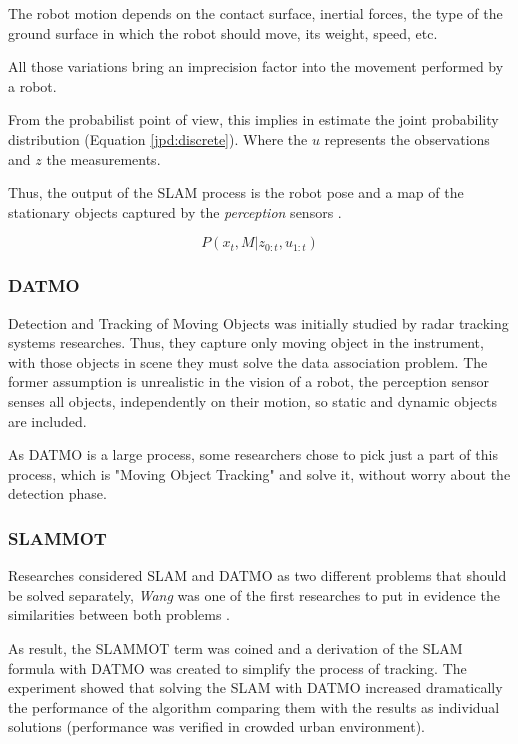 The robot motion depends on the contact surface, inertial forces, the type of the ground surface in which the robot should move, its weight, speed, etc.

All those variations bring an imprecision factor into the movement performed by a robot.

From the probabilist point of view, this implies in estimate the joint probability distribution (Equation \ref{jpd:discrete}). Where the $u$ represents the observations and $z$ the measurements.

Thus, the output of the SLAM process is the robot pose and a map of the stationary objects captured by the \textit{perception} sensors \cite{iyengar1991autonomous}.


\begin{equation}
\label{jpd:discrete}
P(x_t,M | z_{0:t}, u_{1:t})
\end{equation}


\subsubsection{DATMO}

Detection and Tracking of Moving Objects was initially studied by radar tracking systems \cite{VU-2009-454238} researches. Thus, they capture only moving object in the instrument, with those objects in scene they must solve the data association problem. The former assumption is unrealistic in the vision of a robot, the perception sensor senses all objects, independently on their motion, so static and dynamic objects are included.

As DATMO is a large process, some researchers chose to pick just a part of this process, which is "Moving Object Tracking" and solve it, without worry about the detection phase.

\subsubsection{SLAMMOT}

Researches considered SLAM and DATMO as two different problems that should be solved separately, \textit{Wang} was one of the first researches to put in evidence the similarities between both problems \cite{Wang03onlinesimultaneous}.

As result, the SLAMMOT term was coined and a derivation of the SLAM formula with DATMO was created to simplify the process of tracking. The experiment showed that solving the SLAM with DATMO increased dramatically the performance of the algorithm comparing them with the results as individual solutions (performance was verified in crowded urban environment).

